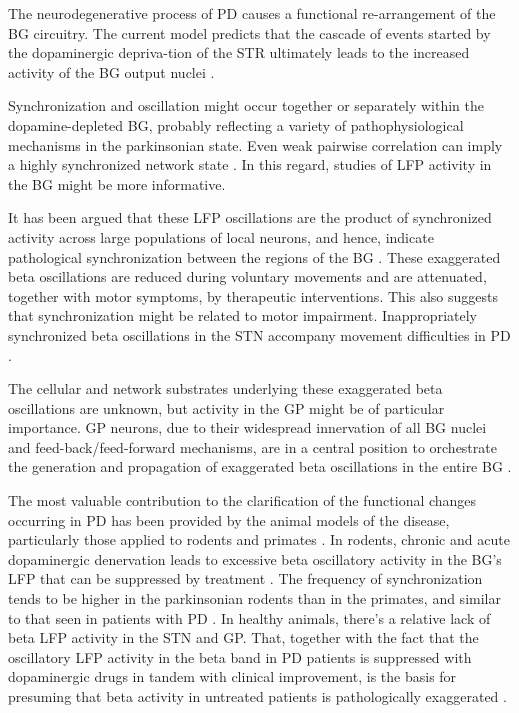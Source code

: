 \documentclass{article}
\begin{document}
The neurodegenerative process of PD causes a functional re-arrangement of the BG circuitry. The current model predicts that the cascade of events started by the dopaminergic depriva-tion of the STR ultimately leads to the increased activity of the BG output nuclei \citep{Cagnan}. 

Synchronization and oscillation might occur together or separately within the dopamine-depleted BG, probably reflecting a variety of pathophysiological mechanisms in the parkinsonian state. Even weak pairwise correlation can imply a highly synchronized network state \citep{Hammond}. In this regard, studies of LFP activity in the BG might be more informative.

It has been argued that these LFP oscillations are the product of synchronized activity across large populations of local neurons, and hence, indicate pathological synchronization between the regions of the BG \citep{Hammond}.
These exaggerated beta oscillations are reduced during voluntary movements and are attenuated, together with motor symptoms, by therapeutic interventions. This also suggests that synchronization might be related to motor impairment. Inappropriately synchronized beta oscillations in the STN accompany movement difficulties in PD \citep{Cagnan}. 

The cellular and network substrates underlying these exaggerated beta oscillations are unknown, but activity in the GP might be of particular importance. GP neurons, due to their widespread innervation of all BG nuclei and feed-back/feed-forward mechanisms, are in a central position to orchestrate the generation and propagation of exaggerated beta oscillations in the entire BG \citep{Cagnan}. 

The most valuable contribution to the clarification of the functional changes occurring in PD has been provided by the animal models of the disease, particularly those applied to rodents and primates \citep{Mallet}.
In rodents, chronic and acute dopaminergic denervation leads to excessive beta oscillatory activity in the BG’s LFP that can be suppressed by treatment \citep{Mallet}. The frequency of synchronization tends to be higher in the parkinsonian rodents than in the primates, and similar to that seen in patients with PD \citep{Hammond}.
In healthy animals, there’s a relative lack of beta LFP activity in the STN and GP. That, together with the fact that the oscillatory LFP activity in the beta band in PD patients is suppressed with dopaminergic drugs in tandem with clinical improvement, is the basis for presuming that beta activity in untreated patients is pathologically exaggerated \citep{Mallet}.
\end{document}
